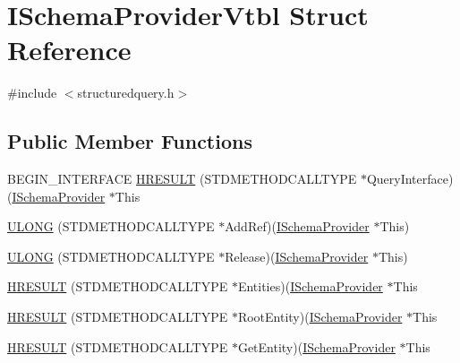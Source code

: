 \hypertarget{struct_i_schema_provider_vtbl}{}\section{I\+Schema\+Provider\+Vtbl Struct Reference}
\label{struct_i_schema_provider_vtbl}


{\ttfamily \#include $<$structuredquery.\+h$>$}

\subsection*{Public Member Functions}
\begin{DoxyCompactItemize}
\item 
B\+E\+G\+I\+N\+\_\+\+I\+N\+T\+E\+R\+F\+A\+CE \hyperlink{struct_i_schema_provider_vtbl_af68112813f81b49484865fd081b27e57}{H\+R\+E\+S\+U\+LT} (S\+T\+D\+M\+E\+T\+H\+O\+D\+C\+A\+L\+L\+T\+Y\+PE $\ast$Query\+Interface)(\hyperlink{structuredquery_8h_afffb1fb827b569b0b58a1ba88756a965}{I\+Schema\+Provider} $\ast$This
\item 
\hyperlink{struct_i_schema_provider_vtbl_a87a5bf54d05e7256534ed1b0d5051c3d}{U\+L\+O\+NG} (S\+T\+D\+M\+E\+T\+H\+O\+D\+C\+A\+L\+L\+T\+Y\+PE $\ast$Add\+Ref)(\hyperlink{structuredquery_8h_afffb1fb827b569b0b58a1ba88756a965}{I\+Schema\+Provider} $\ast$This)
\item 
\hyperlink{struct_i_schema_provider_vtbl_a46f79b17360c6d1f1b3d47ed1af5a815}{U\+L\+O\+NG} (S\+T\+D\+M\+E\+T\+H\+O\+D\+C\+A\+L\+L\+T\+Y\+PE $\ast$Release)(\hyperlink{structuredquery_8h_afffb1fb827b569b0b58a1ba88756a965}{I\+Schema\+Provider} $\ast$This)
\item 
\hyperlink{struct_i_schema_provider_vtbl_a3fbaaf0054a01ddee3f8303da3cd89cd}{H\+R\+E\+S\+U\+LT} (S\+T\+D\+M\+E\+T\+H\+O\+D\+C\+A\+L\+L\+T\+Y\+PE $\ast$Entities)(\hyperlink{structuredquery_8h_afffb1fb827b569b0b58a1ba88756a965}{I\+Schema\+Provider} $\ast$This
\item 
\hyperlink{struct_i_schema_provider_vtbl_acefa658cea0b86d7973faf3ede4d3334}{H\+R\+E\+S\+U\+LT} (S\+T\+D\+M\+E\+T\+H\+O\+D\+C\+A\+L\+L\+T\+Y\+PE $\ast$Root\+Entity)(\hyperlink{structuredquery_8h_afffb1fb827b569b0b58a1ba88756a965}{I\+Schema\+Provider} $\ast$This
\item 
\hyperlink{struct_i_schema_provider_vtbl_a27053e322425525ea02af541dc1eb65e}{H\+R\+E\+S\+U\+LT} (S\+T\+D\+M\+E\+T\+H\+O\+D\+C\+A\+L\+L\+T\+Y\+PE $\ast$Get\+Entity)(\hyperlink{structuredquery_8h_afffb1fb827b569b0b58a1ba88756a965}{I\+Schema\+Provider} $\ast$This

\end{DoxyCompactItemize}
